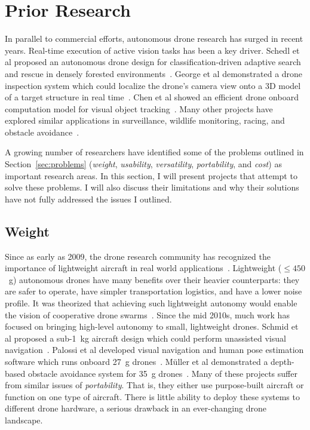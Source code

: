 \section{Prior Research}
\label{sec:prior-work}
In parallel to commercial efforts, autonomous drone research has surged in recent years. Real-time execution of active vision tasks has been a key driver. Schedl et al proposed an autonomous drone design for classification-driven adaptive search and rescue in densely forested environments~\cite{Schedl2021}. George et al demonstrated a drone inspection system which could localize the drone's camera view onto a 3D model of a target structure in real time~\cite{George2019}. Chen et al showed an efficient drone onboard computation model for visual object tracking~\cite{Chen2018}. Many other projects have explored similar applications in surveillance, wildlife monitoring, racing, and obstacle avoidance~\cite{Apvrille2014,Li2020,Devos2018,Alsalam2017,Ward2016}.  

A growing number of researchers have identified some of the problems outlined in Section~\ref{sec:problems} (\textit{weight}, \textit{usability}, \textit{versatility}, \textit{portability}, and \textit{cost}) as important research areas. In this section, I will present projects that attempt to solve these problems. I will also discuss their limitations and why their solutions have not fully addressed the issues I outlined.

\subsection{Weight}
Since as early as 2009, the drone research community has recognized the importance of lightweight aircraft in real world applications~\cite{Burkle2011, Burkle2009}. Lightweight ($\leq 450$~g) autonomous drones have many benefits over their heavier counterparts: they are safer to operate, have simpler transportation logistics, and have a lower noise profile. It was theorized that achieving such lightweight autonomy would enable the vision of cooperative drone swarms~\cite{Floreano2015}. Since the mid 2010s, much work has focused on bringing high-level autonomy to small, lightweight drones. Schmid et al proposed a sub-1~kg aircraft design which could perform unassisted visual navigation~\cite{Schmid2014}. Palossi et al developed visual navigation and human pose estimation software which runs onboard 27~g drones~\cite{Palossi2019,Palossi2021}. M{\"u}ller et al demonstrated a depth-based obstacle avoidance system for 35~g drones~\cite{Muller2023}. Many of these projects suffer from similar issues of \textit{portability}. That is, they either use purpose-built aircraft or function on one type of aircraft. There is little ability to deploy these systems to different drone hardware, a serious drawback in an ever-changing drone landscape. 

